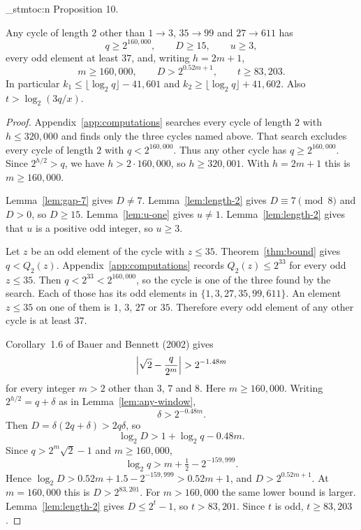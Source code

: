 \documentclass[11pt]{article}
\newenvironment{named}[1]{%
  \par\addvspace{\medskipamount}%
  \pagebreak[3]%
  \noindent{\bfseries #1}\space\ignorespaces
  \stmtoc{#1}%
}{\par\addvspace{\medskipamount}}
\newcommand{\stmtoc}[1]{ \qn_stmtoc:n {#1} }
\newcounter{lemmaref}
\newcommand{\marklemma}[2]{%
  \setcounter{lemmaref}{#1}%
  \addtocounter{lemmaref}{-1}%
  \refstepcounter{lemmaref}%
  \label{#2}%
}
\begin{document}
\begin{named}{Proposition 10.}
\marklemma{10}{prop:other-two}
Any cycle of length $2$ other than $1 \to 3$, $35 \to 99$ and $27 \to 611$ has
\[
q \ge 2^{160{,}000}, \qquad D \ge 15, \qquad u \ge 3,
\]
every odd element at least $37$, and, writing $h = 2m + 1$,
\[
m \ge 160{,}000, \qquad D > 2^{0.52 m + 1}, \qquad t \ge 83{,}203.
\]
In particular $k_1 \le \lfloor \log_2 q \rfloor - 41{,}601$ and $k_2 \ge \lfloor \log_2 q \rfloor + 41{,}602$.
Also $t > \log_2(3q/x)$.
\end{named}

\begin{proof}
Appendix~\ref{app:computations} searches every cycle of length $2$ with $h \le 320{,}000$ and finds only the three cycles named above.
That search excludes every cycle of length $2$ with $q < 2^{160{,}000}$.
Thus any other cycle has $q \ge 2^{160{,}000}$.
Since $2^{h/2} > q$, we have $h > 2 \cdot 160{,}000$, so $h \ge 320{,}001$.
With $h = 2m + 1$ this is $m \ge 160{,}000$.

Lemma~\ref{lem:gap-7} gives $D \ne 7$.
Lemma~\ref{lem:length-2} gives $D \equiv 7 \pmod{8}$ and $D > 0$, so $D \ge 15$.
Lemma~\ref{lem:u-one} gives $u \ne 1$.
Lemma~\ref{lem:length-2} gives that $u$ is a positive odd integer, so $u \ge 3$.

Let $z$ be an odd element of the cycle with $z \le 35$.
Theorem~\ref{thm:bound} gives $q < Q_2(z)$.
Appendix~\ref{app:computations} records $Q_2(z) \le 2^{33}$ for every odd $z \le 35$.
Then $q < 2^{33} < 2^{160{,}000}$, so the cycle is one of the three found by the search.
Each of those has its odd elements in $\{1, 3, 27, 35, 99, 611\}$.
An element $z \le 35$ on one of them is $1$, $3$, $27$ or $35$.
Therefore every odd element of any other cycle is at least $37$.

Corollary~1.6 of Bauer and Bennett (2002) gives
\[
\Bigl| \sqrt{2} - \frac{q}{2^m} \Bigr| > 2^{-1.48 m}
\]
for every integer $m > 2$ other than $3$, $7$ and $8$.
Here $m \ge 160{,}000$.
Writing $2^{h/2} = q + \delta$ as in Lemma~\ref{lem:any-window},
\[
\delta > 2^{-0.48 m}.
\]
Then $D = \delta(2q + \delta) > 2q\delta$, so
\[
\log_2 D > 1 + \log_2 q - 0.48 m.
\]
Since $q > 2^m \sqrt{2} - 1$ and $m \ge 160{,}000$,
\[
\log_2 q > m + \tfrac12 - 2^{-159{,}999}.
\]
Hence $\log_2 D > 0.52 m + 1.5 - 2^{-159{,}999} > 0.52 m + 1$, and $D > 2^{0.52 m + 1}$.
At $m = 160{,}000$ this is $D > 2^{83{,}201}$.
For $m > 160{,}000$ the same lower bound is larger.
Lemma~\ref{lem:length-2} gives $D \le 2^t - 1$, so $t > 83{,}201$.
Since $t$ is odd, $t \ge 83{,}203$.


\end{proof}
\end{document}
